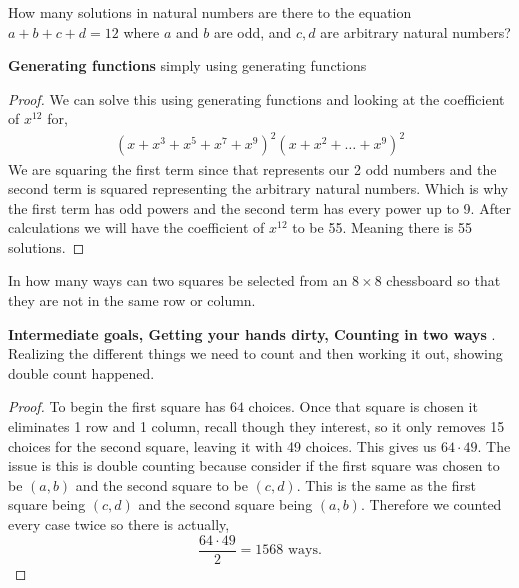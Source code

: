 \documentclass[11pt]{article}
\newenvironment{problem}[2][Problem\!]{\begin{trivlist}
\item[\hskip \labelsep {\bfseries #1}\hskip \labelsep {\bfseries #2}]}{\end{trivlist}}
\begin{document}
\begin{tcolorbox}
    \begin{problem} {IC | 11/01 | 109.}
        How many solutions in natural numbers are there to the equation $a + b + c + d = 12$ where $a$ and $b$ are odd, and $c,d$ are arbitrary natural numbers?
    \end{problem}
    \textbf{Generating functions} simply using generating functions
\end{tcolorbox}
\begin{proof}
    We can solve this using generating functions and looking at the coefficient of $x^{12}$ for,
    \begin{align*}
        (x + x^{3} + x^{5} + x^{7} + x^{9})^{2}(x + x^{2} + \dots + x^{9})^{2}
    \end{align*}
    We are squaring the first term since that represents our 2 odd numbers and the second term is squared representing the arbitrary natural numbers. Which is why the first term has odd powers and the second term has every power up to 9. After calculations we will have the coefficient of $x^{12}$ to be 55. Meaning there is 55 solutions.
\end{proof}

\begin{tcolorbox}
    \begin{problem} {IC | 11/05 | 110.}
        In how many ways can two squares be selected from an $8\times 8$ chessboard so that they are not in the same row or column.
    \end{problem}
    \textbf{Intermediate goals, Getting your hands dirty, Counting in two ways }. Realizing the different things we need to count and then working it out, showing double count happened. 
\end{tcolorbox}
\begin{proof}
    To begin the first square has $64$ choices. Once that square is chosen it eliminates 1 row and 1 column, recall though they interest, so it only removes 15 choices for the second square, leaving it with 49 choices. This gives us $64 \cdot 49$. The issue is this is double counting because consider if the first square was chosen to be $(a,b)$ and the second square to be $(c,d)$. This is the same as the first square being $(c,d)$ and the second square being $(a,b)$. Therefore we counted every case twice so there is actually,
    \[\frac{64\cdot 49}{2} = 1568 \text{ ways.}\]
\end{proof}
\end{document}
